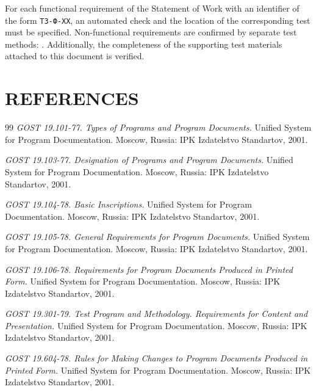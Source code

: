 \documentclass[12pt,a4paper]{extarticle}
\begin{document}
\begin{hseExample}
For each functional requirement of the Statement of Work with an identifier of the form \texttt{ТЗ-Ф-XX}, an automated check and the location of the corresponding test must be specified. Non-functional requirements are confirmed by separate test methods: . Additionally, the completeness of the supporting test materials attached to this document is verified.
\end{hseExample}

\clearpage
\pagestyle{appendix}

\section*{REFERENCES}

\renewcommand{\refname}{}
\begin{thebibliography}{99}
\emph{GOST 19.101-77. Types of Programs and Program Documents.} Unified System for Program Documentation. Moscow, Russia: IPK Izdatelstvo Standartov, 2001.

\emph{GOST 19.103-77. Designation of Programs and Program Documents.} Unified System for Program Documentation. Moscow, Russia: IPK Izdatelstvo Standartov, 2001.

\emph{GOST 19.104-78. Basic Inscriptions.} Unified System for Program Documentation. Moscow, Russia: IPK Izdatelstvo Standartov, 2001.

\emph{GOST 19.105-78. General Requirements for Program Documents.} Unified System for Program Documentation. Moscow, Russia: IPK Izdatelstvo Standartov, 2001.

\emph{GOST 19.106-78. Requirements for Program Documents Produced in Printed Form.} Unified System for Program Documentation. Moscow, Russia: IPK Izdatelstvo Standartov, 2001.

\emph{GOST 19.301-79. Test Program and Methodology. Requirements for Content and Presentation.} Unified System for Program Documentation. Moscow, Russia: IPK Izdatelstvo Standartov, 2001.

\emph{GOST 19.604-78. Rules for Making Changes to Program Documents Produced in Printed Form.} Unified System for Program Documentation. Moscow, Russia: IPK Izdatelstvo Standartov, 2001.
\end{thebibliography}

\clearpage



\end{document}

